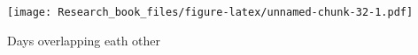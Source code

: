 \documentclass[]{book}
\newenvironment{Shaded}{\begin{snugshade}}{\end{snugshade}}
\newcommand{\KeywordTok}[1]{\textcolor[rgb]{0.13,0.29,0.53}{\textbf{#1}}}
\newcommand{\DataTypeTok}[1]{\textcolor[rgb]{0.13,0.29,0.53}{#1}}
\newcommand{\DecValTok}[1]{\textcolor[rgb]{0.00,0.00,0.81}{#1}}
\newcommand{\StringTok}[1]{\textcolor[rgb]{0.31,0.60,0.02}{#1}}
\newcommand{\OperatorTok}[1]{\textcolor[rgb]{0.81,0.36,0.00}{\textbf{#1}}}
\newcommand{\NormalTok}[1]{#1}
\theoremstyle{definition}
\theoremstyle{definition}
\theoremstyle{definition}
\theoremstyle{remark}
\begin{document}
\begin{Shaded}
\begin{Highlighting}[]
{{{{{{\NormalTok{Paradise23<-}\StringTok{ }\NormalTok{Paradise_5400_}\DecValTok{2017} \OperatorTok{%>%}\StringTok{ }\KeywordTok{group_by}\NormalTok{(date,month,day,hr) }\OperatorTok{%>%}\StringTok{ }\KeywordTok{filter}\NormalTok{(}\KeywordTok{as.numeric}\NormalTok{(month) }\OperatorTok{%in%}\StringTok{ }\KeywordTok{c}\NormalTok{(}\DecValTok{7}\NormalTok{,}\DecValTok{8}\NormalTok{,}\DecValTok{9}\NormalTok{) }\OperatorTok{&}\StringTok{ }\KeywordTok{as.numeric}\NormalTok{(day) }\OperatorTok{%in%}\StringTok{ }\KeywordTok{c}\NormalTok{(}\DecValTok{23}\NormalTok{) ) }\OperatorTok{%>%}\StringTok{  }\KeywordTok{ggplot}\NormalTok{() }\OperatorTok{+}\StringTok{  }\KeywordTok{geom_line}\NormalTok{(}\KeywordTok{aes}\NormalTok{(}\KeywordTok{as.numeric}\NormalTok{(hr),Temperature..deg.F.,}\DataTypeTok{group=}\NormalTok{month,}\DataTypeTok{color=}\NormalTok{month)) }\OperatorTok{+}\StringTok{ }\KeywordTok{theme_minimal}\NormalTok{() }\OperatorTok{+}\KeywordTok{xlab}\NormalTok{(}\StringTok{"Hour"}\NormalTok{) }\OperatorTok{+}\StringTok{ }\KeywordTok{ylab}\NormalTok{(}\StringTok{"Temperature"}\NormalTok{) }\OperatorTok{+}\StringTok{ }\KeywordTok{ggtitle}\NormalTok{(}\StringTok{"Paradise 5400 NWAC - Calendar year 2017  - 23rd day"}\NormalTok{) }\OperatorTok{+}\StringTok{ }\KeywordTok{scale_color_discrete}\NormalTok{(}\DataTypeTok{name=}\StringTok{"Month"}\NormalTok{)}

\KeywordTok{grid.arrange}\NormalTok{(Paradise9,Paradise16,Paradise23)}
\end{Highlighting}
\end{Shaded}

\texttt{[image: Research\_book\_files/figure-latex/unnamed-chunk-32-1.pdf]}

Days overlapping eath other
\end{document}
